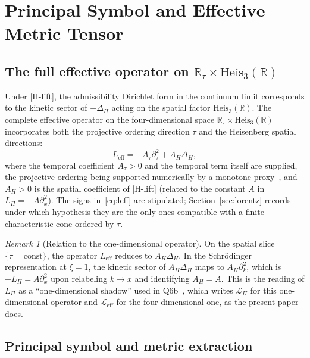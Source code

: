 \documentclass[11pt,a4paper]{article}
\theoremstyle{definition}
\theoremstyle{remark}
\newtheorem{remark}[theorem]{Remark}
\newcommand{\HeisR}{\mathrm{Heis}_3(\mathbb{R})}
\newcommand{\DeltaH}{\Delta_H}
\newcommand{\LPi}{L_\Pi}
\begin{document}
  \section{Principal Symbol and Effective Metric Tensor}
  \label{sec:metric}

  \subsection{\texorpdfstring{The full effective operator on $\mathbb{R}_\tau \times \HeisR$}{The full effective
  operator on R x Heis3(R)}}

    Under [H-lift], the admissibility Dirichlet form in the continuum limit corresponds
    to the kinetic sector of $-\DeltaH$ acting on the spatial factor $\HeisR$.
    The complete effective operator on the four-dimensional space
    $\mathbb{R}_\tau \times \HeisR$ incorporates both the projective ordering direction
    $\tau$ and the Heisenberg spatial directions:
    \begin{equation}
      L_{\mathrm{eff}} = -A_\tau \partial_\tau^2 + A_H \DeltaH,
      \label{eq:leff}
    \end{equation}
    where the temporal coefficient $A_\tau > 0$ and the temporal term itself are supplied, the projective ordering
    being supported numerically by a monotone proxy~\cite{Beau2026pto}, and $A_H > 0$ is the spatial coefficient of
    [H-lift] (related to the constant $A$ in $\LPi = -A\partial_x^2$).
    The signs in~\eqref{eq:leff} are stipulated; Section~\ref{sec:lorentz} records under which hypothesis they are
    the only ones compatible with a finite characteristic cone ordered by $\tau$.

    \begin{remark}[Relation to the one-dimensional operator]
      \label{rem:shadow}
On the spatial slice $\{\tau = \text{const}\}$, the operator $L_{\mathrm{eff}}$ reduces to
$A_H \DeltaH$.
In the Schr\"{o}dinger representation at $\xi = 1$, the kinetic sector of $A_H \DeltaH$
maps to $A_H \partial_k^2$, which is $-\LPi = A \partial_x^2$ upon relabeling
$k \to x$ and identifying $A_H = A$.
This is the reading of $\LPi$ as a ``one-dimensional shadow'' used in Q6b~\cite{Beau2026q6b}, which writes
$\mathcal{L}_\Pi$ for this one-dimensional operator and $\mathcal{L}_{\mathrm{eff}}$ for the four-dimensional one,
as the present paper does.
    \end{remark}

  \subsection{Principal symbol and metric extraction}
\end{document}
